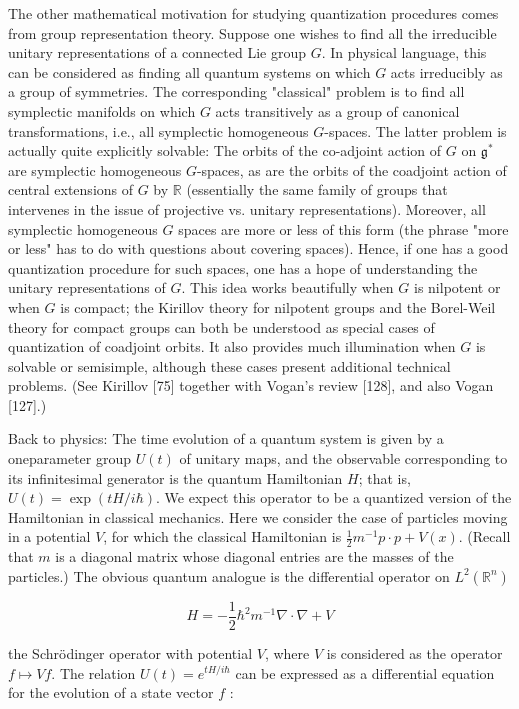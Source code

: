 \documentclass[10pt, letterpaper]{article}
\begin{document}
The other mathematical motivation for studying quantization procedures comes from group representation theory. Suppose one wishes to find all the irreducible unitary representations of a connected Lie group $G$. In physical language, this can be considered as finding all quantum systems on which $G$ acts irreducibly as a group of symmetries. The corresponding "classical" problem is to find all symplectic manifolds on which $G$ acts transitively as a group of canonical transformations, i.e., all symplectic homogeneous $G$-spaces. The latter problem is actually quite explicitly solvable: The orbits of the co-adjoint action of $G$ on $\mathfrak{g}^{*}$ are symplectic homogeneous $G$-spaces, as are the orbits of the coadjoint action of central extensions of $G$ by $\mathbb{R}$ (essentially the same family of groups that intervenes in the issue of projective vs. unitary representations). Moreover, all symplectic homogeneous $G$ spaces are more or less of this form (the phrase "more or less" has to do with questions about covering spaces). Hence, if one has a good quantization procedure for such spaces, one has a hope of understanding the unitary representations of $G$. This idea works beautifully when $G$ is nilpotent or when $G$ is compact; the Kirillov theory for nilpotent groups and the Borel-Weil theory for compact groups can both be understood as special cases of quantization of coadjoint orbits. It also provides much illumination when $G$ is solvable or semisimple, although these cases present additional technical problems. (See Kirillov [75] together with Vogan's review [128], and also Vogan [127].)

Back to physics: The time evolution of a quantum system is given by a oneparameter group $U(t)$ of unitary maps, and the observable corresponding to its infinitesimal generator is the quantum Hamiltonian $H$; that is, $U(t)=\exp (t H / i \hbar)$. We expect this operator to be a quantized version of the Hamiltonian in classical mechanics. Here we consider the case of particles moving in a potential $V$, for which the classical Hamiltonian is $\frac{1}{2} m^{-1} p \cdot p+V(x)$. (Recall that $m$ is a diagonal matrix whose diagonal entries are the masses of the particles.) The obvious quantum analogue is the differential operator on $L^{2}\left(\mathbb{R}^{n}\right)$

$$
H=-\frac{1}{2} \hbar^{2} m^{-1} \nabla \cdot \nabla+V
$$

the Schrödinger operator with potential $V$, where $V$ is considered as the operator $f \mapsto V f$. The relation $U(t)=e^{t H / i \hbar}$ can be expressed as a differential equation for the evolution of a state vector $f$ :
\end{document}
